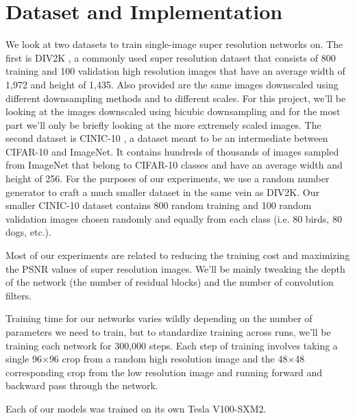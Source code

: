 \documentclass[conference]{IEEEtran}
\begin{document}
\section{Dataset and Implementation}
We look at two datasets to train single-image super resolution networks on.
The first is DIV2K \cite{b2}, a commonly used super resolution dataset that consists of 800 training and 100 validation high resolution images that have an average width of 1,972 and height of 1,435.
Also provided are the same images downscaled using different downsampling methods and to different scales.
For this project, we'll be looking at the images downscaled using bicubic downsampling and for the most part we'll only be briefly looking at the more extremely scaled images.
The second dataset is CINIC-10 \cite{b3}, a dataset meant to be an intermediate between CIFAR-10 and ImageNet.
It contains hundreds of thousands of images sampled from ImageNet that belong to CIFAR-10 classes and have an average width and height of 256.
For the purposes of our experiments, we use a random number generator to craft a much smaller dataset in the same vein as DIV2K.
Our smaller CINIC-10 dataset contains 800 random training and 100 random validation images chosen randomly and equally from each class (i.e. 80 birds, 80 dogs, etc.).

Most of our experiments are related to reducing the training cost and maximizing the PSNR values of super resolution images.
We'll be mainly tweaking the depth of the network (the number of residual blocks) and the number of convolution filters.

Training time for our networks varies wildly depending on the number of parameters we need to train, but to standardize training across runs, we'll be training each network for 300,000 steps.
Each step of training involves taking a single 96$\times$96 crop from a random high resolution image and the 48$\times$48 corresponding crop from the low resolution image and running forward and backward pass through the network.

Each of our models was trained on its own Tesla V100-SXM2.
\end{document}
